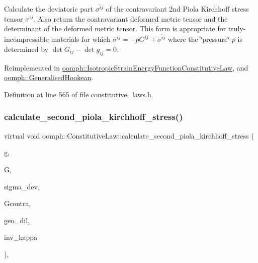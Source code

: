 Calculate the deviatoric part $ \overline{ \sigma^{ij}}$ of the contravariant 2nd Piola Kirchhoff stress tensor $ \sigma^{ij}$. Also return the contravariant deformed metric tensor and the determinant of the deformed metric tensor. This form is appropriate for truly-\/incompressible materials for which $ \sigma^{ij} = - p G^{ij} +\overline{ \sigma^{ij}} $ where the \char`\"{}pressure\char`\"{} $ p $ is determined by $ \det G_{ij} - \det g_{ij} = 0 $. 



Reimplemented in \hyperlink{classoomph_1_1IsotropicStrainEnergyFunctionConstitutiveLaw_acf61673ecc4f960fee908378ac48544a}{oomph\+::\+Isotropic\+Strain\+Energy\+Function\+Constitutive\+Law}, and \hyperlink{classoomph_1_1GeneralisedHookean_a641d0893e485df52b48b15e189a850ed}{oomph\+::\+Generalised\+Hookean}.



Definition at line 565 of file constitutive\+\_\+laws.\+h.

\mbox{\label{classoomph_1_1ConstitutiveLaw_a26f34355b626bebcad8f498fa5271d20}} 
\subsubsection{\texorpdfstring{calculate\+\_\+second\+\_\+piola\+\_\+kirchhoff\+\_\+stress()}{calculate\_second\_piola\_kirchhoff\_stress()}\hspace{0.1cm}{\footnotesize\ttfamily [3/3]}}
{\footnotesize\ttfamily virtual void oomph\+::\+Constitutive\+Law\+::calculate\+\_\+second\+\_\+piola\+\_\+kirchhoff\+\_\+stress (\begin{DoxyParamCaption}\item[{const \hyperlink{classoomph_1_1DenseMatrix}{Dense\+Matrix}$<$ double $>$ \&}]{g,  }\item[{const \hyperlink{classoomph_1_1DenseMatrix}{Dense\+Matrix}$<$ double $>$ \&}]{G,  }\item[{\hyperlink{classoomph_1_1DenseMatrix}{Dense\+Matrix}$<$ double $>$ \&}]{sigma\+\_\+dev,  }\item[{\hyperlink{classoomph_1_1DenseMatrix}{Dense\+Matrix}$<$ double $>$ \&}]{Gcontra,  }\item[{double \&}]{gen\+\_\+dil,  }\item[{double \&}]{inv\+\_\+kappa }\end{DoxyParamCaption})\hspace{0.3cm}{\ttfamily [inline]}, {\ttfamily [virtual]}}



